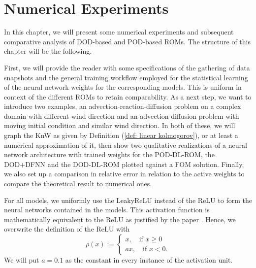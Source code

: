 \chapter{Numerical Experiments} \label{chapter: numerical experiments}




In this chapter, we will present some numerical experiments and subsequent comparative
analysis of DOD-based and POD-based ROMs. The structure of this chapter
will be the following.

First, we will provide the reader with some specifications of the 
gathering of data snapshots and the general training 
workflow employed for the statistical learning of the neural network weights for the
corresponding models. 
This is uniform in context of the different ROMs to retain comparability. As a next step, we
want to introduce two examples, an advection-reaction-diffusion problem on a complex domain with different wind direction
and an advection-diffusion problem with moving initial condition and similar wind direction. In both of these, we will
graph the KnW as given by Definition (\ref{def: linear kolmogorov}), or at least a numerical approximation of
it, then show two qualitative realizations of a neural network architecture with trained weights for the
POD-DL-ROM, the DOD+DFNN and the DOD-DL-ROM plotted against a FOM solution. Finally, we also
set up a comparison in relative error in relation to the active weights to compare the theoretical result
to numerical ones.

For all models, we uniformly use the LeakyReLU instead of the ReLU to form the neural networks
contained in the models. This activation function is mathematically
equivalent to the ReLU as justified by the paper \cite{geist2020}. Hence, we overwrite the
definition of the ReLU with
\begin{equation*}
    \rho(x) := \begin{cases}
        x, \quad \text{if }x \geq 0 \\
        a x, \quad \text{if }x < 0.
    \end{cases}
\end{equation*}
We will put $a = 0.1$ as the constant in every instance of the activation unit.

